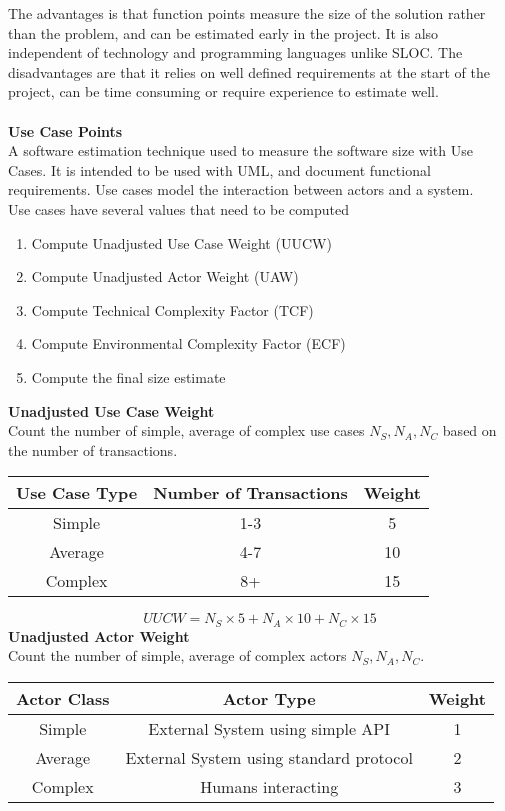\documentclass[a4paper,10pt]{article}
\begin{document}
The advantages is that function points measure the size of the solution rather than the problem, and can be estimated early in the project. It is also independent of technology and programming languages unlike SLOC. The disadvantages are that it relies on well defined requirements at the start of the project, can be time consuming or require experience to estimate well. \\\\
\textbf{Use Case Points} \\
A software estimation technique used to measure the software size with Use Cases. It is intended to be used with UML, and document functional requirements. Use cases model the interaction between actors and a system. \\
Use cases have several values that need to be computed 
\begin{enumerate}
	\item Compute Unadjusted Use Case Weight (UUCW)
	\item Compute Unadjusted Actor Weight (UAW)
	\item Compute Technical Complexity Factor (TCF)
	\item Compute Environmental Complexity Factor (ECF)
	\item Compute the final size estimate 
\end{enumerate}
\textbf{Unadjusted Use Case Weight} \\
Count the number of simple, average of complex use cases $N_{S}, N_{A}, N_{C}$ based on the number of transactions. \\
\begin{center}
	\begin{tabular}{|c|c|c|}
		\hline 
		Use Case Type &Number of Transactions &Weight \\
		\hline 
		Simple &1-3 &5 \\
		\hline
		Average &4-7 &10 \\
		\hline
		Complex &8+ &15 \\
		\hline
	\end{tabular}
\end{center}
\begin{equation*}
	UUCW = N_{S} \times 5 + N_{A} \times 10 + N_{C} \times 15
\end{equation*}
\textbf{Unadjusted Actor Weight} \\
Count the number of simple, average of complex actors $N_{S}, N_{A}, N_{C}$. \\
\begin{center}
	\begin{tabular}{|c|c|c|}
		\hline 
		Actor Class &Actor Type &Weight \\
		\hline 
		Simple &External System using simple API &1 \\
		\hline
		Average &External System using standard protocol &2 \\
		\hline
		Complex &Humans interacting &3 \\
		\hline
	\end{tabular}
\end{center}
\end{document}
